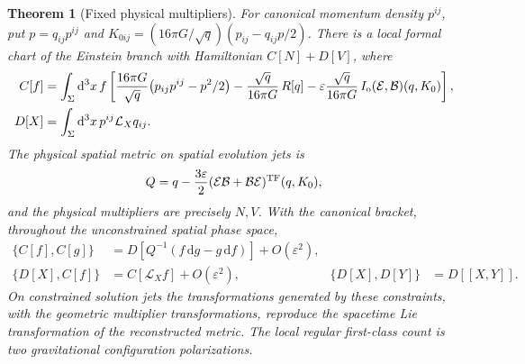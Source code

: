 \documentclass[11pt]{article}
\newtheorem{theorem}{Theorem}
\newcommand{\dd}{\mathrm d}
\newcommand{\eps}{\varepsilon}
\newcommand{\TF}{\mathrm{TF}}
\newcommand{\Lie}{\mathcal L}
\newcommand{\GN}{16\pi G}
\begin{document}
\begin{theorem}[Fixed physical multipliers]\label{thm:adm}
For canonical momentum density \(p^{ij}\), put \(p=q_{ij}p^{ij}\) and
\(K_{0ij}=(\GN/\sqrt q)(p_{ij}-q_{ij}p/2)\). There is a local formal chart of the Einstein branch with Hamiltonian \(C[N]+D[V]\), where
\begin{align}
 C[f]&=\int_\Sigma \dd^3x\,f
 \left[
 \frac{\GN}{\sqrt q}\bigl(p_{ij}p^{ij}-p^2/2\bigr)
 -\frac{\sqrt q}{\GN}\,R[q]
 -\eps\frac{\sqrt q}{\GN}\,I_{\rm o}({\cal E},{\cal B})(q,K_0)
 \right],\label{eq:constraint}\\
 D[X]&=\int_\Sigma \dd^3x\,p^{ij}\Lie_Xq_{ij}.\nonumber
\end{align}
The physical spatial metric on spatial evolution jets is
\begin{equation}
 Q=q-\frac{3\eps}{2}({\cal E}{\cal B}+{\cal B}{\cal E})^{\TF}(q,K_0),
 \label{eq:physical}
\end{equation}
and the physical multipliers are precisely \(N,V\). With the canonical bracket, throughout the unconstrained spatial phase space,
\begin{align}
 \{C[f],C[g]\}&=D[Q^{-1}(f\,\dd g-g\,\dd f)]+O(\eps^2),\label{eq:strong}\\
 \{D[X],C[f]\}&=C[\Lie_X f]+O(\eps^2),&
 \{D[X],D[Y]\}&=D[[X,Y]].
\end{align}
On constrained solution jets the transformations generated by these constraints, with the geometric multiplier transformations, reproduce the spacetime Lie transformation of the reconstructed metric. The local regular first-class count is two gravitational configuration polarizations.
\end{theorem}
\end{document}
